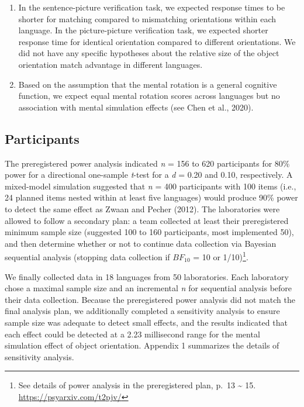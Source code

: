 \documentclass[
  man]{apa7}
\begin{document}
\begin{enumerate}
\def\labelenumi{(\arabic{enumi})}
\item
  In the sentence-picture verification task, we expected response times to be shorter for matching compared to mismatching orientations within each language. In the picture-picture verification task, we expected shorter response time for identical orientation compared to different orientations. We did not have any specific hypotheses about the relative size of the object orientation match advantage in different languages.
\item
  Based on the assumption that the mental rotation is a general cognitive function, we expect equal mental rotation scores across languages but no association with mental simulation effects (see Chen et al., 2020).
\end{enumerate}

\hypertarget{participants}{%
\subsection{Participants}\label{participants}}

The preregistered power analysis indicated \emph{n} = 156 to 620 participants for 80\% power for a directional one-sample \emph{t}-test for a \emph{d} = 0.20 and 0.10, respectively. A mixed-model simulation suggested that \emph{n} = 400 participants with 100 items (i.e., 24 planned items nested within at least five languages) would produce 90\% power to detect the same effect as Zwaan and Pecher (2012). The laboratories were allowed to follow a secondary plan: a team collected at least their preregistered minimum sample size (suggested 100 to 160 participants, most implemented 50), and then determine whether or not to continue data collection via Bayesian sequential analysis (stopping data collection if \(BF_{10}\) = 10 or 1/10)\footnote{See details of power analysis in the preregistered plan, p.~13 \textasciitilde{} 15. \url{https://psyarxiv.com/t2pjv/}}.

We finally collected data in 18 languages from 50 laboratories. Each laboratory chose a maximal sample size and an incremental \emph{n} for sequential analysis before their data collection. Because the preregistered power analysis did not match the final analysis plan, we additionally completed a sensitivity analysis to ensure sample size was adequate to detect small effects, and the results indicated that each effect could be detected at a 2.23 millisecond range for the mental simulation effect of object orientation. Appendix 1 summarizes the details of sensitivity analysis.
\end{document}
